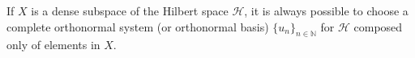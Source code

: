\begin{lemma}
	If $X$ is a dense subspace of the Hilbert space $\mathcal{H}$, it is always possible to
	choose a complete orthonormal system (or orthonormal basis) $\{u_n\}_{n\in\mathbb{N}}$ for
	$\mathcal{H}$ composed only of elements in $X$.
\end{lemma}
